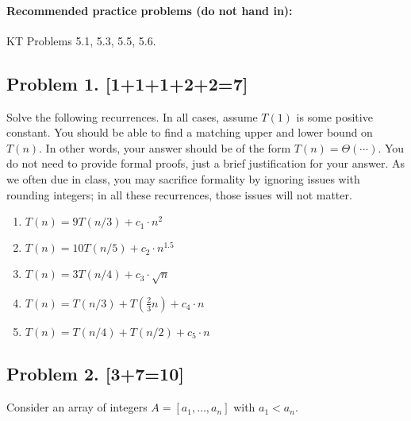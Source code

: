 \documentclass[10pt]{article}
\begin{document}
\paragraph{Recommended practice problems (do not hand in):} KT Problems 5.1, 5.3, 5.5, 5.6. 

\newpage

\subsection*{Problem 1. [1+1+1+2+2=7]}

  Solve the following recurrences. In all cases, assume $T(1)$ is some positive constant. You should be able to find a matching upper and lower bound on $T(n)$. In other words, your answer should be of the form $T(n) = \Theta(\cdots)$. You do not need to provide formal proofs, just a brief justification for your answer. As we often due in class, you may sacrifice formality by ignoring issues with rounding integers; in all these recurrences, those issues will not matter.

\begin{enumerate}
\item $T(n) = 9 T(n/3) + c_1 \cdot n^2$

\item $T(n) = 10 T(n/5) + c_2 \cdot n^{1.5}$

\item $T(n) = 3 T(n/4) + c_3 \cdot \sqrt{n}$

\item $T(n) = T(n/3) + T(\frac{2}{3} n) + c_4 \cdot n$

\item $T(n) = T(n/4) + T(n/2) + c_5 \cdot n$
\end{enumerate}


\subsection*{Problem 2. [3+7=10]}

Consider an array of integers  $A=[a_1,\ldots, a_n]$ with $a_1 < a_n$. 
\end{document}

